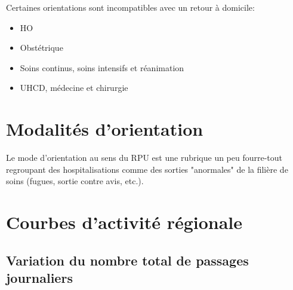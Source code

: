\documentclass[12pt,english,french,twoside]{book}\usepackage[]{graphicx}\usepackage[]{color}
\begin{document}
Certaines orientations sont incompatibles avec un retour à domicile:
\begin{itemize}
  \item HO
  \item Obstétrique
  \item Soins continus, soins intensifs et réanimation
  \item UHCD, médecine et chirurgie
  
\end{itemize}




\newpage
\chapter{Modalités d'orientation}



Le mode d'orientation au sens du RPU est une rubrique un peu fourre-tout regroupant des hospitalisations comme des sorties "anormales" de la filière de soins (fugues, sortie contre avis, etc.).


\newpage
\chapter{Courbes d'activité régionale}

 

\section{Variation du nombre total de passages journaliers}
\end{document}
